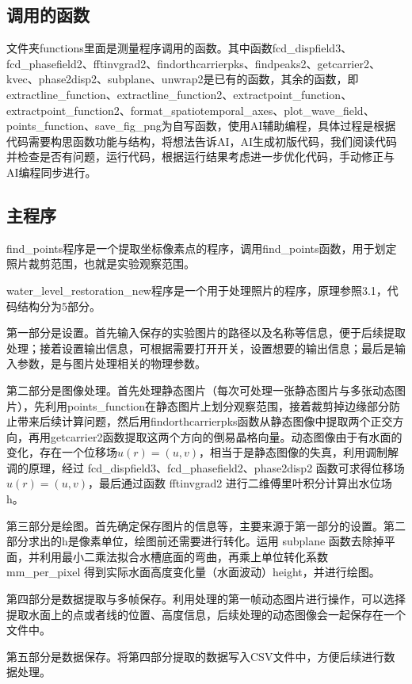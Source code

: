 \documentclass[11pt,a4paper]{ctexart}
\begin{document}
\subsection{调用的函数}
文件夹functions里面是测量程序调用的函数。其中函数fcd\_dispfield3、fcd\_phasefield2、fftinvgrad2、findorthcarrierpks、findpeaks2、getcarrier2、kvec、phase2disp2、subplane、unwrap2是已有的函数，其余的函数，即extractline\_function、extractline\_function2、extractpoint\_function、extractpoint\_function2、format\_spatiotemporal\_axes、plot\_wave\_field、points\_function、save\_fig\_png为自写函数，使用AI辅助编程，具体过程是根据代码需要构思函数功能与结构，将想法告诉AI，AI生成初版代码，我们阅读代码并检查是否有问题，运行代码，根据运行结果考虑进一步优化代码，手动修正与AI编程同步进行。
\subsection{主程序}

find\_points程序是一个提取坐标像素点的程序，调用find\_points函数，用于划定照片裁剪范围，也就是实验观察范围。

water\_level\_restoration\_new程序是一个用于处理照片的程序，原理参照3.1，代码结构分为5部分。

第一部分是设置。首先输入保存的实验图片的路径以及名称等信息，便于后续提取处理；接着设置输出信息，可根据需要打开开关，设置想要的输出信息；最后是输入参数，是与图片处理相关的物理参数。

第二部分是图像处理。首先处理静态图片（每次可处理一张静态图片与多张动态图片），先利用points\_function在静态图片上划分观察范围，接着裁剪掉边缘部分防止带来后续计算问题，然后用findorthcarrierpks函数从静态图像中提取两个正交方向，再用getcarrier2函数提取这两个方向的倒易晶格向量。动态图像由于有水面的变化，存在一个位移场$u(r) = (u, v)$，相当于是静态图像的失真，利用调制解调的原理，经过 fcd\_dispfield3、fcd\_phasefield2、phase2disp2 函数可求得位移场$u(r) = (u, v)$，最后通过函数 fftinvgrad2 进行二维傅里叶积分计算出水位场 h。

第三部分是绘图。首先确定保存图片的信息等，主要来源于第一部分的设置。第二部分求出的h是像素单位，绘图前还需要进行转化。运用 subplane 函数去除掉平面，并利用最小二乘法拟合水槽底面的弯曲，再乘上单位转化系数 mm\_per\_pixel 得到实际水面高度变化量（水面波动）height，并进行绘图。

第四部分是数据提取与多帧保存。利用处理的第一帧动态图片进行操作，可以选择提取水面上的点或者线的位置、高度信息，后续处理的动态图像会一起保存在一个文件中。

第五部分是数据保存。将第四部分提取的数据写入CSV文件中，方便后续进行数据处理。
\end{document}
